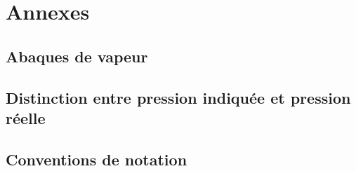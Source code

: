 \appendix
\chapter*{Annexes}
\renewcommand{\chaptermark}{Annexes}

	\clearpage
	\section{Abaques de vapeur}

		

	\clearpage
	\begin{spacing}{1.06}
	\pagestyle{empty}
	[\vspace{-0.5cm}]
	\pagestyle{fancy}
	\end{spacing}%
	\restoregeometry%

\widecenteredpagegeometry
	\section[Pression indiquée et pression réelle]{Distinction entre pression indiquée et pression réelle}
	\label{ch_annexe_pression}

		
	
	\clearpage	
	\section{Conventions de notation}
		
				


